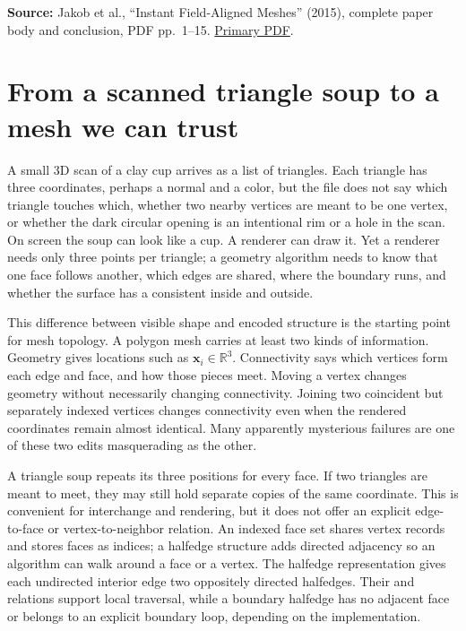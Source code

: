 \textbf{Source:} Jakob et al., ``Instant Field-Aligned Meshes'' (2015), complete paper body and conclusion, PDF pp.~1--15. \href{https://igl.ethz.ch/projects/instant-meshes/instant-meshes-SA-2015-jakob-et-al-compressed.pdf}{Primary PDF}.

\section{From a scanned triangle soup to a mesh we can trust}\label{03-visual-computing-i-ch002-from-a-scanned-triangle-soup-to-a-mesh-we-can-trust}

\hypertarget{03-visual-computing-i-ch002-from-a-scanned-triangle-soup-to-a-mesh-we-can-trust}{}

A small 3D scan of a clay cup arrives as a list of triangles. Each triangle has three coordinates, perhaps a normal and a color, but the file does not say which triangle touches which, whether two nearby vertices are meant to be one vertex, or whether the dark circular opening is an intentional rim or a hole in the scan. On screen the soup can look like a cup. A renderer can draw it. Yet a renderer needs only three points per triangle; a geometry algorithm needs to know that one face follows another, which edges are shared, where the boundary runs, and whether the surface has a consistent inside and outside.

This difference between visible shape and encoded structure is the starting point for mesh topology. A polygon mesh carries at least two kinds of information. Geometry gives locations such as \(\mathbf x_i\in\mathbb R^3\). Connectivity says which vertices form each edge and face, and how those pieces meet. Moving a vertex changes geometry without necessarily changing connectivity. Joining two coincident but separately indexed vertices changes connectivity even when the rendered coordinates remain almost identical. Many apparently mysterious failures are one of these two edits masquerading as the other.

A triangle soup repeats its three positions for every face. If two triangles are meant to meet, they may still hold separate copies of the same coordinate. This is convenient for interchange and rendering, but it does not offer an explicit edge-to-face or vertex-to-neighbor relation. An indexed face set shares vertex records and stores faces as indices; a halfedge structure adds directed adjacency so an algorithm can walk around a face or a vertex. The halfedge representation gives each undirected interior edge two oppositely directed halfedges. Their  and  relations support local traversal, while a boundary halfedge has no adjacent face or belongs to an explicit boundary loop, depending on the implementation.

